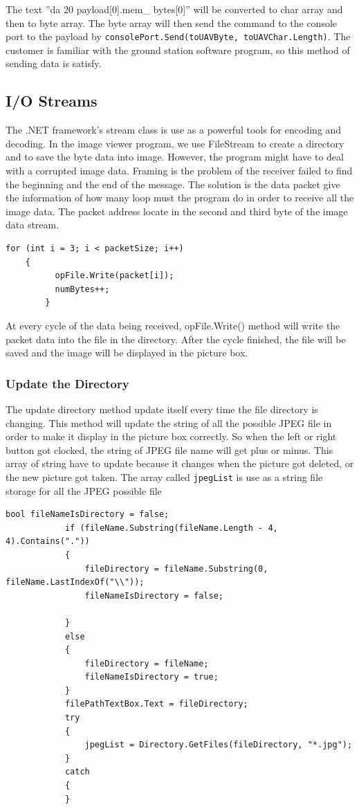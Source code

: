 The text ''da 20 payload[0].mem\_ bytes[0]'' will be converted to char array and then to byte array. The byte array will then send the command to the console port to the payload by \texttt{consolePort.Send(toUAVByte, toUAVChar.Length)}. The customer is familiar with the ground station software program, so this method of sending data is satisfy. 

\subsection{I/O Streams}
    The .NET framework's stream class is use as a powerful tools for encoding and decoding\cite{davidB}. In the image viewer program, we use FileStream to create a directory and to save the byte data into image. However, the program might have to deal with a corrupted image data. Framing is the problem of the receiver failed to find the beginning and the end of the message. The solution is the data packet give the information of how many loop must the program do in order to receive all the image data. The packet address locate in the second and third byte of the image data stream. 
     

\begin{lstlisting}[caption={writing binary file},label=lst:writingb]          
	for (int i = 3; i < packetSize; i++)
	{
          opFile.Write(packet[i]);
          numBytes++;
    	}
\end{lstlisting}         

       At every cycle of the data being received, opFile.Write() method will write the packet data into the file in the directory. After the cycle finished, the file will be saved and the image will be displayed in the picture box. 
\subsubsection*{Update the Directory}
The update directory method update itself every time the file directory is changing. This method will update the string of all the possible JPEG file in order to make it display in the picture box correctly. So when the left or right button got clocked, the string of JPEG file name will get plus or minus. This array of string have to update because it changes when the picture got deleted, or the new picture got taken. The array called \texttt{jpegList} is use as a string file storage for all the JPEG possible file
\begin{lstlisting}[caption=update directory class highlight, label=updateD]
            bool fileNameIsDirectory = false;
            if (fileName.Substring(fileName.Length - 4, 4).Contains("."))
            {
                fileDirectory = fileName.Substring(0, fileName.LastIndexOf("\\"));
                fileNameIsDirectory = false;

            }
            else
            {
                fileDirectory = fileName;
                fileNameIsDirectory = true;
            }
            filePathTextBox.Text = fileDirectory;
            try
            {
                jpegList = Directory.GetFiles(fileDirectory, "*.jpg");
            }
            catch
            {
            }
\end{lstlisting}
